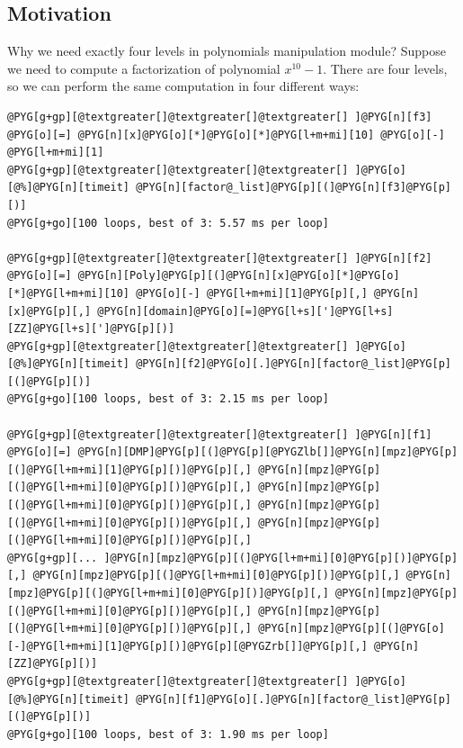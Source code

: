 \subsection{Motivation}

Why we need exactly four levels in polynomials manipulation module? Suppose we need to compute
a factorization of polynomial $x^{10} - 1$. There are four levels, so we can perform the same
computation in four different ways:

\begin{Verbatim}[commandchars=@\[\]]
@PYG[g+gp][@textgreater[]@textgreater[]@textgreater[] ]@PYG[n][f3] @PYG[o][=] @PYG[n][x]@PYG[o][*]@PYG[o][*]@PYG[l+m+mi][10] @PYG[o][-] @PYG[l+m+mi][1]
@PYG[g+gp][@textgreater[]@textgreater[]@textgreater[] ]@PYG[o][@%]@PYG[n][timeit] @PYG[n][factor@_list]@PYG[p][(]@PYG[n][f3]@PYG[p][)]
@PYG[g+go][100 loops, best of 3: 5.57 ms per loop]

@PYG[g+gp][@textgreater[]@textgreater[]@textgreater[] ]@PYG[n][f2] @PYG[o][=] @PYG[n][Poly]@PYG[p][(]@PYG[n][x]@PYG[o][*]@PYG[o][*]@PYG[l+m+mi][10] @PYG[o][-] @PYG[l+m+mi][1]@PYG[p][,] @PYG[n][x]@PYG[p][,] @PYG[n][domain]@PYG[o][=]@PYG[l+s][']@PYG[l+s][ZZ]@PYG[l+s][']@PYG[p][)]
@PYG[g+gp][@textgreater[]@textgreater[]@textgreater[] ]@PYG[o][@%]@PYG[n][timeit] @PYG[n][f2]@PYG[o][.]@PYG[n][factor@_list]@PYG[p][(]@PYG[p][)]
@PYG[g+go][100 loops, best of 3: 2.15 ms per loop]

@PYG[g+gp][@textgreater[]@textgreater[]@textgreater[] ]@PYG[n][f1] @PYG[o][=] @PYG[n][DMP]@PYG[p][(]@PYG[p][@PYGZlb[]]@PYG[n][mpz]@PYG[p][(]@PYG[l+m+mi][1]@PYG[p][)]@PYG[p][,] @PYG[n][mpz]@PYG[p][(]@PYG[l+m+mi][0]@PYG[p][)]@PYG[p][,] @PYG[n][mpz]@PYG[p][(]@PYG[l+m+mi][0]@PYG[p][)]@PYG[p][,] @PYG[n][mpz]@PYG[p][(]@PYG[l+m+mi][0]@PYG[p][)]@PYG[p][,] @PYG[n][mpz]@PYG[p][(]@PYG[l+m+mi][0]@PYG[p][)]@PYG[p][,]
@PYG[g+gp][... ]@PYG[n][mpz]@PYG[p][(]@PYG[l+m+mi][0]@PYG[p][)]@PYG[p][,] @PYG[n][mpz]@PYG[p][(]@PYG[l+m+mi][0]@PYG[p][)]@PYG[p][,] @PYG[n][mpz]@PYG[p][(]@PYG[l+m+mi][0]@PYG[p][)]@PYG[p][,] @PYG[n][mpz]@PYG[p][(]@PYG[l+m+mi][0]@PYG[p][)]@PYG[p][,] @PYG[n][mpz]@PYG[p][(]@PYG[l+m+mi][0]@PYG[p][)]@PYG[p][,] @PYG[n][mpz]@PYG[p][(]@PYG[o][-]@PYG[l+m+mi][1]@PYG[p][)]@PYG[p][@PYGZrb[]]@PYG[p][,] @PYG[n][ZZ]@PYG[p][)]
@PYG[g+gp][@textgreater[]@textgreater[]@textgreater[] ]@PYG[o][@%]@PYG[n][timeit] @PYG[n][f1]@PYG[o][.]@PYG[n][factor@_list]@PYG[p][(]@PYG[p][)]
@PYG[g+go][100 loops, best of 3: 1.90 ms per loop]


\end{Verbatim}
